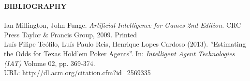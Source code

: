 \documentclass[10pt, a4paper, twocolumn]{article} %
\begin{document}

{\Large {\textbf{BIBLIOGRAPHY}}} \\ \\
Ian Millington, John Funge. \textit{Artificial Intelligence for \indent Games 2nd Edition.} CRC Press Taylor \& Francis \indent Group, 2009. Printed\\ 

Luís Filipe Teófilo, Luís Paulo Reis, Henrique Lopes \indent Cardoso (2013). ''Estimating the Odds for Texas \indent Hold'em Poker Agents''. In: \textit{Intelligent Agent \indent Technologies (IAT)} Volume 02, pp. 369-374. \\ \indent URL: http://dl.acm.org/citation.cfm?id=2569335

\printbibliography[title={Bibliography}] %


\end{document}
